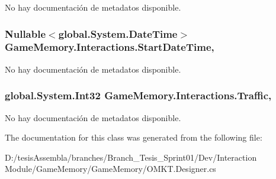 No hay documentación de metadatos disponible. 

\hypertarget{class_game_memory_1_1_interactions_adba80b56aece549cdfe01fbe9f618371}{
\subsubsection[{Start\-Date\-Time}]{\setlength{\rightskip}{0pt plus 5cm}Nullable$<$global.\-System.\-Date\-Time$>$ Game\-Memory.\-Interactions.\-Start\-Date\-Time\hspace{0.3cm}{\ttfamily [get]}, {\ttfamily [set]}}}\label{class_game_memory_1_1_interactions_adba80b56aece549cdfe01fbe9f618371}


No hay documentación de metadatos disponible. 

\hypertarget{class_game_memory_1_1_interactions_a3604b151ab46856b0bcb7156476cf279}{
\subsubsection[{Traffic}]{\setlength{\rightskip}{0pt plus 5cm}global.\-System.\-Int32 Game\-Memory.\-Interactions.\-Traffic\hspace{0.3cm}{\ttfamily [get]}, {\ttfamily [set]}}}\label{class_game_memory_1_1_interactions_a3604b151ab46856b0bcb7156476cf279}


No hay documentación de metadatos disponible. 



The documentation for this class was generated from the following file\-:\begin{DoxyCompactItemize}
\item 
D\-:/tesis\-Assembla/branches/\-Branch\-\_\-\-Tesis\-\_\-\-Sprint01/\-Dev/\-Interaction Module/\-Game\-Memory/\-Game\-Memory/O\-M\-K\-T.\-Designer.\-cs\end{DoxyCompactItemize}
